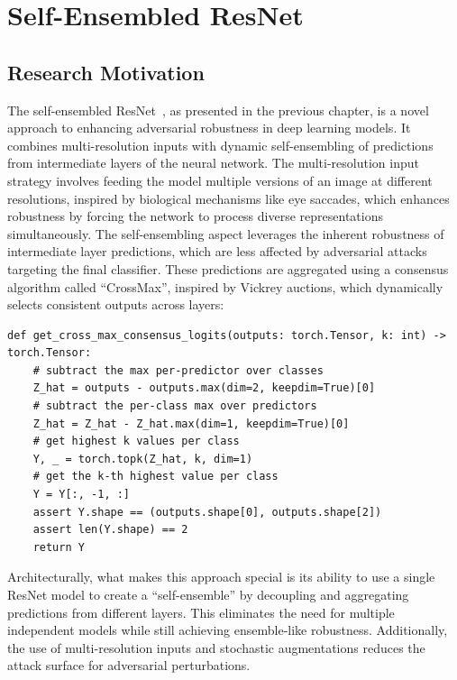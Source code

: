\documentclass[a4paper, oneside]{discothesis}
\begin{document}
% 
% 

\section{Self-Ensembled ResNet}

\subsection{Research Motivation}

The self-ensembled ResNet~\cite{fort2024ensemble}, as presented in the previous chapter, is a novel approach to enhancing adversarial robustness in deep learning models. It combines multi-resolution inputs with dynamic self-ensembling of predictions from intermediate layers of the neural network. The multi-resolution input strategy involves feeding the model multiple versions of an image at different resolutions, inspired by biological mechanisms like eye saccades, which enhances robustness by forcing the network to process diverse representations simultaneously. The self-ensembling aspect leverages the inherent robustness of intermediate layer predictions, which are less affected by adversarial attacks targeting the final classifier. These predictions are aggregated using a consensus algorithm called ``CrossMax'', inspired by Vickrey auctions, which dynamically selects consistent outputs across layers:

\begin{verbatim}
def get_cross_max_consensus_logits(outputs: torch.Tensor, k: int) -> torch.Tensor:
    # subtract the max per-predictor over classes
    Z_hat = outputs - outputs.max(dim=2, keepdim=True)[0]
    # subtract the per-class max over predictors
    Z_hat = Z_hat - Z_hat.max(dim=1, keepdim=True)[0]
    # get highest k values per class
    Y, _ = torch.topk(Z_hat, k, dim=1)
    # get the k-th highest value per class
    Y = Y[:, -1, :]
    assert Y.shape == (outputs.shape[0], outputs.shape[2])
    assert len(Y.shape) == 2
    return Y
\end{verbatim}

Architecturally, what makes this approach special is its ability to use a single ResNet model to create a ``self-ensemble'' by decoupling and aggregating predictions from different layers. This eliminates the need for multiple independent models while still achieving ensemble-like robustness. Additionally, the use of multi-resolution inputs and stochastic augmentations reduces the attack surface for adversarial perturbations.
\end{document}
